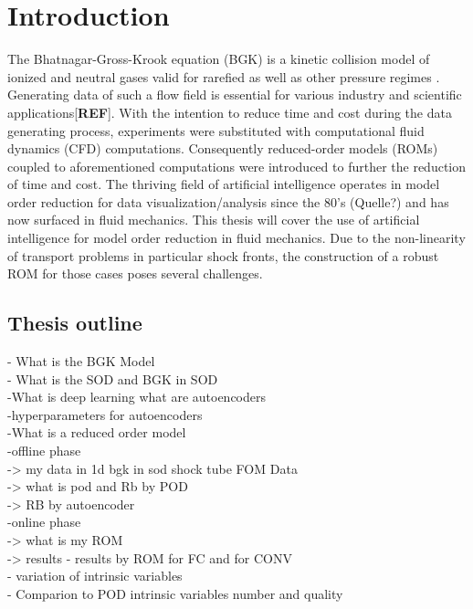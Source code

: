 \chapter{Introduction}
\label{cha:Introduction}
The Bhatnagar-Gross-Krook equation (BGK) is a kinetic collision model of ionized and neutral gases valid for rarefied as well as other pressure regimes \cite{BGK}. Generating data of such a flow field is essential for various industry and scientific applications[\textbf{REF}]. With the intention to reduce time and cost during the data generating process, experiments were substituted with computational fluid dynamics (CFD) computations. Consequently reduced-order models (ROMs) coupled to aforementioned computations were introduced to further the reduction of time and cost. The thriving field of artificial intelligence operates in model order reduction for data visualization/analysis since the 80's (Quelle?)  and has now surfaced in fluid mechanics. This thesis will cover the use of artificial intelligence for model order reduction in fluid mechanics.
Due to the non-linearity of transport problems in particular shock fronts, the construction of a robust ROM for those cases poses several challenges. 
\section{Thesis outline}
- What is the BGK Model\\
- What is the SOD and BGK in SOD\\
-What is deep learning what are autoencoders\\
-hyperparameters for autoencoders\\
-What is a reduced order model \\
-offline phase \\
-> my data in 1d bgk in sod shock tube FOM Data\\
-> what is pod and Rb by POD \\
-> RB by autoencoder \\
-online phase\\
-> what is my ROM \\
-> results - results by ROM for FC and for CONV \\
- variation of intrinsic variables \\
- Comparion to POD intrinsic variables number and quality \\

